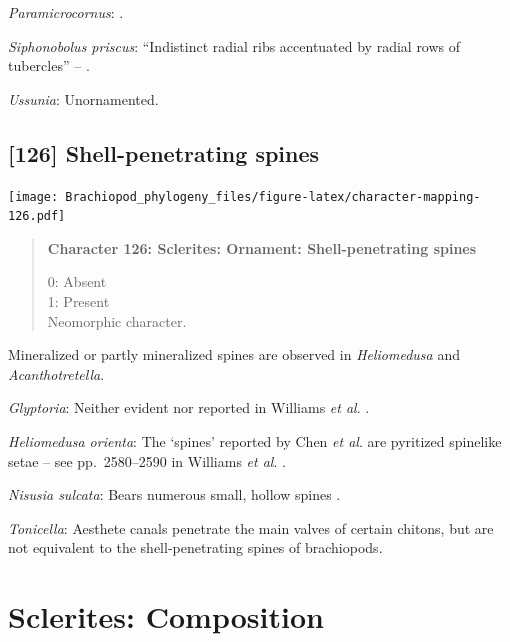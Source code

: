 \documentclass[openany]{book}
\begin{document}
\hypertarget{Paramicrocornus-coding-125}{}
\emph{Paramicrocornus}: \citet{Zhang2018Ahyolithid}.

\hypertarget{Siphonobolus_priscus-coding-125}{}
\emph{Siphonobolus priscus}: ``Indistinct radial ribs accentuated by
radial rows of tubercles'' -- \citet{Popov2009Earlyontogeny}.

\hypertarget{Ussunia-coding-125}{}
\emph{Ussunia}: Unornamented.

\subsection*{{[}126{]} Shell-penetrating
spines}\label{shell-penetrating-spines}

\texttt{[image: Brachiopod\_phylogeny\_files/figure-latex/character-mapping-126.pdf]}

\begin{quote}
\textbf{Character 126: Sclerites: Ornament: Shell-penetrating spines}

0: Absent\\
1: Present\\
Neomorphic character.
\end{quote}

Mineralized or partly mineralized spines are observed in
\emph{Heliomedusa} and \emph{Acanthotretella}.

\hypertarget{Glyptoria-coding-126}{}
\emph{Glyptoria}: Neither evident nor reported in Williams \emph{et al}.
\citeyearpar{Williams2000LinguliformeaCraniiformea}.

\hypertarget{Heliomedusa_orienta-coding-126}{}
\emph{Heliomedusa orienta}: The `spines' reported by Chen \emph{et al}.
\citeyearpar{Chen2007Reinterpretationof} are pyritized spinelike setae
-- see pp.~2580--2590 in Williams \emph{et al}.
\citeyearpar{Williams2007Supplement}.

\hypertarget{Nisusia_sulcata-coding-126}{}
\emph{Nisusia sulcata}: Bears numerous small, hollow spines
\citep{Williams2000LinguliformeaCraniiformea}.

\hypertarget{Tonicella-coding-126}{}
\emph{Tonicella}: Aesthete canals penetrate the main valves of certain
chitons, but are not equivalent to the shell-penetrating spines of
brachiopods.

\section{Sclerites: Composition}\label{sclerites-composition}
\end{document}
